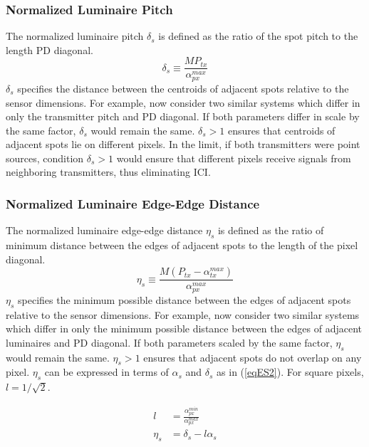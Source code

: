 \subsubsection{Normalized Luminaire Pitch}
\label{subsubsec:osmImagingPitch}
The normalized luminaire pitch $\delta_{s}$ is defined as the ratio of the spot pitch to the length PD diagonal. 
\begin{equation}
	\label{eqDeltaS}
	\delta_{s} \equiv \frac{M P_{tx}}{\alpha_{px}^{max}}
\end{equation}
$\delta_{s}$ specifies the distance between the centroids of adjacent spots relative to the sensor dimensions. For example, now consider two similar systems which differ in only the transmitter pitch and PD diagonal. If both parameters differ in scale by the same factor, $\delta_{s}$ would remain the same. $\delta_{s}>1$ ensures that centroids of adjacent spots lie on different pixels. In the limit, if both transmitters were point sources, condition $\delta_{s}>1$ would ensure that different pixels receive signals from neighboring transmitters, thus eliminating ICI.

\subsubsection{Normalized Luminaire Edge-Edge Distance}
\label{subsubsec:osmImagingEdge}
The normalized luminaire edge-edge distance $\eta_{s}$ is defined as the ratio of minimum distance between the edges of adjacent spots to the length of the pixel diagonal.
\begin{equation}
	\label{eqEtaS}
	\eta_{s} \equiv \frac{M(P_{tx}-\alpha_{tx}^{max})}{\alpha_{px}^{max}}
\end{equation}
$\eta_{s}$ specifies the minimum possible distance between the edges of adjacent spots relative to the sensor dimensions. For example, now consider two similar systems which differ in only the minimum possible distance between the edges of adjacent luminaires and PD diagonal. If both parameters scaled by the same factor, $\eta_{s}$ would remain the same. $\eta_{s}>1$ ensures that adjacent spots do not overlap on any pixel. $\eta_{s}$ can be expressed in terms of $\alpha_{s}$ and $\delta_{s}$ as in (\ref{eqES2}). For square pixels, $l=1/\sqrt{2}$.

\begin{eqnarray}
	l &= \frac{\alpha_{px}^{min}}{\alpha_{px}^{max}}\label{eqESl}\\
	\eta_{s} &= \delta_{s} - l\alpha_{s}\label{eqES2}
\end{eqnarray}

